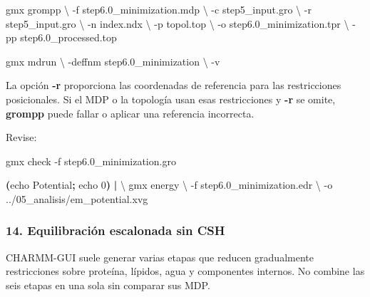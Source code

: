 \documentclass[
  spanish,
  11pt,
  a4paper]{article}
\newenvironment{Shaded}{\begin{snugshade}}{\end{snugshade}}
\newcommand{\AttributeTok}[1]{\textcolor[rgb]{0.13,0.29,0.53}{#1}}
\newcommand{\BuiltInTok}[1]{#1}
\newcommand{\DataTypeTok}[1]{\textcolor[rgb]{0.13,0.29,0.53}{#1}}
\newcommand{\ExtensionTok}[1]{#1}
\newcommand{\KeywordTok}[1]{\textcolor[rgb]{0.13,0.29,0.53}{\textbf{#1}}}
\newcommand{\NormalTok}[1]{#1}
\begin{document}
\begin{Shaded}
\begin{Highlighting}[]
\ExtensionTok{gmx}\NormalTok{ grompp }\DataTypeTok{\textbackslash{}}
    \AttributeTok{{-}f}\NormalTok{ step6.0\_minimization.mdp }\DataTypeTok{\textbackslash{}}
    \AttributeTok{{-}c}\NormalTok{ step5\_input.gro }\DataTypeTok{\textbackslash{}}
    \AttributeTok{{-}r}\NormalTok{ step5\_input.gro }\DataTypeTok{\textbackslash{}}
    \AttributeTok{{-}n}\NormalTok{ index.ndx }\DataTypeTok{\textbackslash{}}
    \AttributeTok{{-}p}\NormalTok{ topol.top }\DataTypeTok{\textbackslash{}}
    \AttributeTok{{-}o}\NormalTok{ step6.0\_minimization.tpr }\DataTypeTok{\textbackslash{}}
    \AttributeTok{{-}pp}\NormalTok{ step6.0\_processed.top}

\ExtensionTok{gmx}\NormalTok{ mdrun }\DataTypeTok{\textbackslash{}}
    \AttributeTok{{-}deffnm}\NormalTok{ step6.0\_minimization }\DataTypeTok{\textbackslash{}}
    \AttributeTok{{-}v}
\end{Highlighting}
\end{Shaded}

La opción \textbf{-r} proporciona las coordenadas de referencia para las
restricciones posicionales. Si el MDP o la topología usan esas
restricciones y \textbf{-r} se omite, \textbf{grompp} puede fallar o
aplicar una referencia incorrecta.

Revise:

\begin{Shaded}
\begin{Highlighting}[]
\ExtensionTok{gmx}\NormalTok{ check }\AttributeTok{{-}f}\NormalTok{ step6.0\_minimization.gro}

\KeywordTok{(}\BuiltInTok{echo}\NormalTok{ Potential}\KeywordTok{;} \BuiltInTok{echo}\NormalTok{ 0}\KeywordTok{)} \KeywordTok{|} \DataTypeTok{\textbackslash{}}
\ExtensionTok{gmx}\NormalTok{ energy }\DataTypeTok{\textbackslash{}}
    \AttributeTok{{-}f}\NormalTok{ step6.0\_minimization.edr }\DataTypeTok{\textbackslash{}}
    \AttributeTok{{-}o}\NormalTok{ ../05\_analisis/em\_potential.xvg}
\end{Highlighting}
\end{Shaded}

\subsubsection{14. Equilibración escalonada sin
CSH}\label{equilibraciuxf3n-escalonada-sin-csh}

CHARMM-GUI suele generar varias etapas que reducen gradualmente
restricciones sobre proteína, lípidos, agua y componentes internos. No
combine las seis etapas en una sola sin comparar sus MDP.
\end{document}
